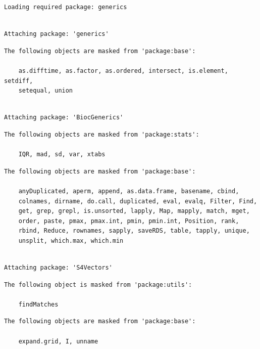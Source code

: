 \documentclass[
  letterpaper,
  DIV=11,
  numbers=noendperiod]{scrartcl}
\begin{document}
\begin{verbatim}
Loading required package: generics
\end{verbatim}

\begin{verbatim}

Attaching package: 'generics'
\end{verbatim}

\begin{verbatim}
The following objects are masked from 'package:base':

    as.difftime, as.factor, as.ordered, intersect, is.element, setdiff,
    setequal, union
\end{verbatim}

\begin{verbatim}

Attaching package: 'BiocGenerics'
\end{verbatim}

\begin{verbatim}
The following objects are masked from 'package:stats':

    IQR, mad, sd, var, xtabs
\end{verbatim}

\begin{verbatim}
The following objects are masked from 'package:base':

    anyDuplicated, aperm, append, as.data.frame, basename, cbind,
    colnames, dirname, do.call, duplicated, eval, evalq, Filter, Find,
    get, grep, grepl, is.unsorted, lapply, Map, mapply, match, mget,
    order, paste, pmax, pmax.int, pmin, pmin.int, Position, rank,
    rbind, Reduce, rownames, sapply, saveRDS, table, tapply, unique,
    unsplit, which.max, which.min
\end{verbatim}

\begin{verbatim}

Attaching package: 'S4Vectors'
\end{verbatim}

\begin{verbatim}
The following object is masked from 'package:utils':

    findMatches
\end{verbatim}

\begin{verbatim}
The following objects are masked from 'package:base':

    expand.grid, I, unname
\end{verbatim}
\end{document}
